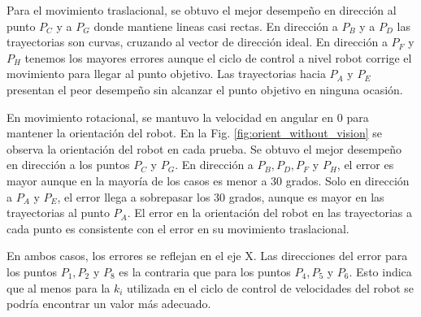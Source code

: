 Para el movimiento traslacional, se obtuvo el mejor desempeño en dirección al punto $P_C$ y a $P_G$ donde mantiene lineas casi rectas. En dirección a $P_B$ y a $P_D$ las trayectorias son curvas, cruzando al vector de dirección ideal. En dirección a $P_F$ y $P_H$ tenemos los mayores errores aunque el ciclo de control a nivel robot corrige el movimiento para llegar al punto objetivo. Las trayectorias hacia $P_A$ y $P_E$ presentan el peor desempeño sin alcanzar el punto objetivo en ninguna ocasión. 

En movimiento rotacional, se mantuvo la velocidad en angular en 0 para mantener la orientación del robot. En la Fig. \ref{fig:orient_without_vision} se observa la orientación del robot en cada prueba. Se obtuvo el mejor desempeño en dirección a los puntos $P_C$ y $P_G$. En dirección a $P_B, P_D, P_F$ y $P_H$, el error es mayor aunque en la mayoría de los casos es menor a 30 grados. Solo en dirección a $P_A$ y $P_E$, el error llega a sobrepasar los 30 grados, aunque es mayor en las trayectorias al punto $P_A$. El error en la orientación del robot en las trayectorias a cada punto es consistente con el error en su movimiento traslacional.

En ambos casos, los errores se reflejan en el eje X. Las direcciones del error para los puntos $P_1, P_2 $ y $P_8$ es la contraria que para los puntos $P_4, P_5$ y $P_6$. Esto indica que al menos para la $k_i$ utilizada en el ciclo de control de velocidades del robot se podría encontrar un valor más adecuado.

